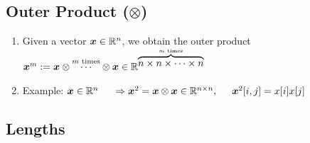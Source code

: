 \subsection{Outer Product ($\otimes$)}

\begin{enumerate}
    \item Given a vector $\bm{x} \in \mathbb{R}^n$, we obtain the outer product $\bm{x}^m := \bm{x} \otimes \overset{m \text{ times}}{\cdots} \otimes \bm{x} \in \mathbb{R}^{\overset{m \text{ times}}{\overbrace{n \times n \times \cdots \times n}}}$
    \hfill \cite{mfml/book/mml/Deisenroth-Faisal-Ong}

    \item Example:
    $
        \bm{x} \in \mathbb{R}^n
        \hspace{0.5cm}
        \Rightarrow \bm{x}^2 = \bm{x} \otimes \bm{x} \in \mathbb{R}^{n\times n},
        \hspace{0.5cm}
        \bm{x}^2[i, j] = x[i]x[j]
    $
    \hfill \cite{mfml/book/mml/Deisenroth-Faisal-Ong}
\end{enumerate}






\subsection{Lengths}

